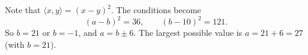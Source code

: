 Note that $\langle x,y\rangle=(x-y)^2$. The conditions become
\[(a-b)^2=36,\qquad(b-10)^2=121.\]
So $b=21$ or $b=-1$, and $a=b\pm6$. The largest possible value is $a=21+6=\boxed{27}$ (with $b=21$).
